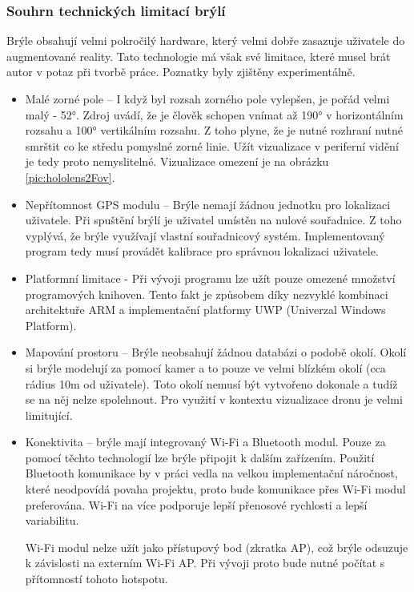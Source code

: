 \subsubsection{Souhrn technických limitací brýlí}
Brýle obsahují velmi pokročilý hardware, který velmi dobře zasazuje uživatele do augmentované reality. Tato technologie má však své limitace, které musel brát autor v potaz při tvorbě práce. Poznatky byly zjištěny experimentálně. 
\begin{itemize}
    \item Malé zorné pole -- I když byl rozsah zorného pole vylepšen, je pořád velmi malý - 52°.  Zdroj \cite{HumanEye} uvádí, že je člověk schopen vnímat až 190° v horizontálním rozsahu a 100° vertikálním rozsahu. Z toho plyne, že je nutné rozhraní nutné smrštit co ke středu pomyslné zorné linie. Užít vizualizace v periferní vidění je tedy proto nemyslitelné. Vizualizace omezení je na obrázku \ref{pic:hololens2Fov}.
    \item Nepřítomnost GPS modulu -- Brýle nemají žádnou jednotku pro lokalizaci uživatele. Při spuštění brýlí je uživatel umístěn na nulové souřadnice. Z toho vyplývá, že brýle využívají vlastní souřadnicový systém. Implementovaný program tedy musí provádět kalibrace pro správnou lokalizaci uživatele.
    
    \item Platformní limitace - Při vývoji programu lze užít pouze omezené množství programových knihoven. Tento fakt je způsobem díky nezvyklé kombinaci  architektuře ARM a implementační platformy UWP (Univerzal Windows Platform).

    \item Mapování prostoru -- Brýle neobsahují žádnou databázi o podobě okolí. Okolí si brýle modelují za pomocí kamer a to pouze ve velmi blízkém okolí (cca rádius 10m od uživatele). Toto okolí nemusí být vytvořeno dokonale a tudíž se na něj nelze spolehnout. Pro využití v kontextu vizualizace dronu je velmi limitující.
    \item Konektivita -- brýle mají integrovaný Wi-Fi a Bluetooth modul. Pouze za pomocí těchto technologií lze brýle připojit k dalším zařízením. Použití Bluetooth komunikace by v práci vedla na velkou implementační náročnost, které neodpovídá povaha projektu, proto bude komunikace přes Wi-Fi modul preferována. Wi-Fi na více podporuje lepší přenosové rychlosti a lepší variabilitu. 
    
    Wi-Fi modul nelze užít jako přístupový bod (zkratka AP), což brýle odsuzuje k závislosti na externím Wi-Fi AP. Při vývoji proto bude nutné počítat s přítomností tohoto hotspotu. 
\end{itemize}
